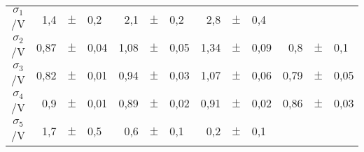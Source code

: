 \begin{table}[h]
\begin{tabular}{c | r p{0.05cm} l r p{0.05cm} l r p{0.05cm} l r p{0.05cm} l}
      $\sigma_1$/V &         1,4          &$\pm$ & 0,2      &   2,1          &$\pm$ & 0,2     & 2,8  & $\pm$ & 0,4   &    &   &  \\ 
      $\sigma_2$/V &         0,87         &$\pm$ & 0,04     &   1,08          &$\pm$ & 0,05    & 1,34  & $\pm$ &  0,09  &  0,8  & $\pm$  & 0,1 \\ 
      $\sigma_3$/V &         0,82         &$\pm$ & 0,01      &   0,94         &$\pm$ & 0,03    & 1,07  & $\pm$ & 0,06   &   0,79 & $\pm$  & 0,05 \\ 
      $\sigma_4$/V &        0,9          &$\pm$ & 0,01    &   0,89         &$\pm$ & 0,02    &  0,91 & $\pm$ &  0,02  &  0,86  & $\pm$  & 0,03 \\ 
      $\sigma_5$/V &         1,7          &$\pm$ & 0,5      &   0,6         &$\pm$ & 0,1     & 0,2  & $\pm$ & 0,1   &    &   &  \\ 
      \bottomrule
    \end{tabular}
  \end{table}

